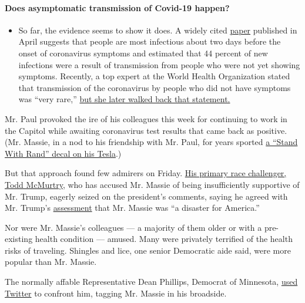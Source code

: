 \begin{itemize}
{  \paragraph{Does asymptomatic transmission of Covid-19
  happen?}\label{does-asymptomatic-transmission-of-covid-19-happen}}

  \begin{itemize}
  \tightlist
  \item
    So far, the evidence seems to show it does. A widely cited
    \href{https://www.nature.com/articles/s41591-020-0869-5}{paper}
    published in April suggests that people are most infectious about
    two days before the onset of coronavirus symptoms and estimated that
    44 percent of new infections were a result of transmission from
    people who were not yet showing symptoms. Recently, a top expert at
    the World Health Organization stated that transmission of the
    coronavirus by people who did not have symptoms was ``very rare,''
    \href{https://www.nytimes.com/2020/06/09/world/coronavirus-updates.html?action=click\&pgtype=Article\&state=default\&region=MAIN_CONTENT_3\&context=storylines_faq\#link-1f302e21}{but
    she later walked back that statement.}
  \end{itemize}
\end{itemize}

Mr. Paul provoked the ire of his colleagues this week for continuing to
work in the Capitol while awaiting coronavirus test results that came
back as positive. (Mr. Massie, in a nod to his friendship with Mr. Paul,
for years sported
\href{https://www.rollcall.com/2015/06/01/thomas-massie-talks-tesla/}{a
``Stand With Rand'' decal on his Tesla}.)

But that approach found few admirers on Friday.
\href{https://www.politico.com/news/2020/01/31/thomas-massie-trump-110136}{His
primary race challenger, Todd McMurtry}, who has accused Mr. Massie of
being insufficiently supportive of Mr. Trump, eagerly seized on the
president's comments, saying he agreed with Mr. Trump's
\href{https://twitter.com/realDonaldTrump/status/1243541556424048643?s=20}{assessment}
that Mr. Massie was ``a disaster for America.''

Nor were Mr. Massie's colleagues --- a majority of them older or with a
pre-existing health condition --- amused. Many were privately terrified
of the health risks of traveling. Shingles and lice, one senior
Democratic aide said, were more popular than Mr. Massie.

The normally affable Representative Dean Phillips, Democrat of
Minnesota,
\href{https://twitter.com/RepDeanPhillips/status/1243296323312340992?s=20}{used
Twitter} to confront him, tagging Mr. Massie in his broadside.

